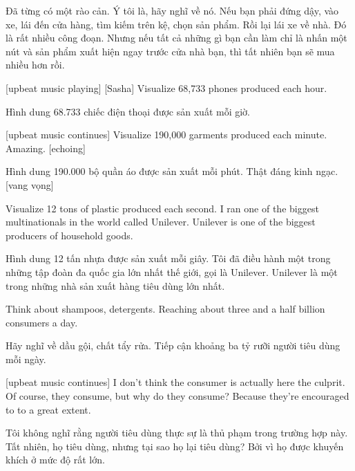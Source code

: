 \documentclass[a4paper]{article}
\begin{document}
	\begin{vietnamese-v2}
		[Mara] Đã từng có một rào cản. Ý tôi là, hãy nghĩ về nó. 
		Nếu bạn phải đứng dậy, vào xe, lái đến cửa hàng, tìm kiếm trên kệ, chọn sản phẩm. 
		Rồi lại lái xe về nhà. Đó là rất nhiều công đoạn. 
		Nhưng nếu tất cả những gì bạn cần làm chỉ là nhấn một nút và sản phẩm xuất hiện ngay trước cửa nhà bạn, thì tất nhiên bạn sẽ mua nhiều hơn rồi.
	\end{vietnamese-v2}
	
	[upbeat music playing]
	[Sasha] Visualize 68,733 phones produced each hour.
	
	\begin{vietnamese-v2}
		 Hình dung 68.733 chiếc điện thoại được sản xuất mỗi giờ.
	\end{vietnamese-v2}
	
	[upbeat music continues]
	Visualize 190,000 garments produced each minute.
	Amazing. [echoing]
	
	\begin{vietnamese-v2}
		Hình dung 190.000 bộ quần áo được sản xuất mỗi phút. 
		Thật đáng kinh ngạc. [vang vọng]
	\end{vietnamese-v2}
	
	Visualize 12 tons of plastic produced each second. I ran one of the biggest multinationals in the world called Unilever.
	Unilever is one of the biggest producers of household goods.
	
	\begin{vietnamese-v2}
		Hình dung 12 tấn nhựa được sản xuất mỗi giây. Tôi đã điều hành một trong những tập đoàn đa quốc gia lớn nhất thế giới, gọi là Unilever. 
		Unilever là một trong những nhà sản xuất hàng tiêu dùng lớn nhất.
	\end{vietnamese-v2}
	
	Think about shampoos, detergents. Reaching about three and a half billion consumers a day.
	
	\begin{vietnamese-v2}
		Hãy nghĩ về dầu gội, chất tẩy rửa. Tiếp cận khoảng ba tỷ rưỡi người tiêu dùng mỗi ngày.
	\end{vietnamese-v2}
	
	[upbeat music continues]
	I don't think the consumer is actually here the culprit.
	Of course, they consume, but why do they consume?
	Because they're encouraged to to a great extent.
	
	\begin{vietnamese-v2}
		 Tôi không nghĩ rằng người tiêu dùng thực sự là thủ phạm trong trường hợp này. 
		Tất nhiên, họ tiêu dùng, nhưng tại sao họ lại tiêu dùng? 
		Bởi vì họ được khuyến khích ở mức độ rất lớn.
	\end{vietnamese-v2}
	
\end{document}
